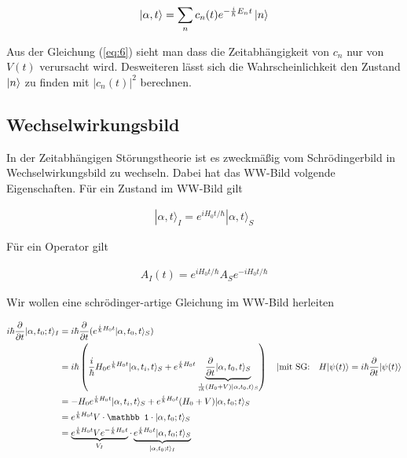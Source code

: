 \begin{align}
  \label{eq:7}
 \left| \alpha,t \right\rangle =\sum_n c_n(t) e^{-\frac{i}{\hbar}E_nt} \left| n \right\rangle 
\end{align}

Aus der Gleichung (\ref{eq:6}) sieht man dass die Zeitabhängigkeit von \(c_n\) nur von \(V(t)\) verursacht wird. Desweiteren lässt sich die Wahrscheinlichkeit den Zustand \(\left| n \right\rangle\) zu finden mit \(|c_n(t)|^2\) berechnen.

\subsection*{Wechselwirkungsbild}

In der Zeitabhängigen Störungstheorie ist es zweckmäßig vom Schrödingerbild in Wechselwirkungsbild zu wechseln. Dabei hat das WW-Bild volgende Eigenschaften. Für ein Zustand im WW-Bild gilt

\begin{align}
  \label{eq:3}
  |\alpha,t\rangle_I = e^{iH_0t/\hbar}|\alpha,t\rangle_S
\end{align}

Für ein Operator gilt

\begin{align}
  \label{eq:4}
   A_I(t) =  e^{iH_0t/\hbar} A_S e^{-iH_0t/\hbar}
\end{align}

Wir wollen eine schrödinger-artige Gleichung im WW-Bild herleiten

\begin{align}
  \label{eq:8}
 i\hbar \frac{\partial}{\partial t}|\alpha,t_0;t\rangle_I &= i\hbar \frac{\partial}{\partial t}(e^{\frac{i}{\hbar}H_0t}|\alpha,t_0,t\rangle_S) \notag\\
&= i\hbar\left(\frac{i}{\hbar}H_0 e^{\frac{i}{\hbar}H_0 t}|\alpha,t_i,t\rangle_S +  e^{\frac{i}{\hbar}H_0t}\underbrace{\frac{\partial}{\partial t}|\alpha,t_0,t\rangle_S}_{\frac{1}{i\hbar}(H_0+V)|\alpha,t_0,t\rangle_S} \right) \quad |\text{mit SG:}\quad H|\psi(t)\rangle=i\hbar \frac{\partial}{\partial t}|\psi(t)\rangle  \notag  \\
&= -H_0 e^{\frac{i}{\hbar}H_0 t}|\alpha,t_i,t\rangle_S + e^{\frac{i}{\hbar}H_0t}(H_0+V)|\alpha,t_0;t\rangle_S \notag \\
&= e^{\frac{i}{\hbar}H_0t}V\cdot\mathbb 1\cdot|\alpha,t_0;t\rangle_S\notag\\
&= \underbrace{e^{\frac{i}{\hbar}H_0t}Ve^{-\frac{i}{\hbar}H_0t}}_{V_I}\cdot \underbrace{e^{\frac{i}{\hbar}H_0t}|\alpha,t_0;t\rangle_S}_{|\alpha,t_0;t\rangle_I}
\end{align}

